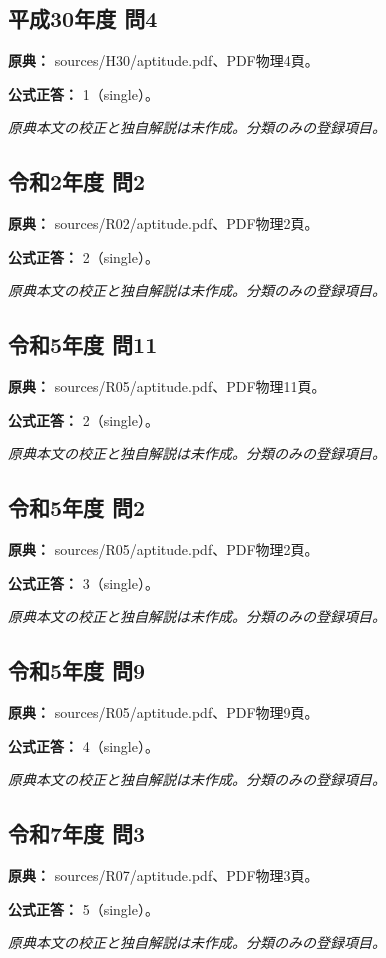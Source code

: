 \subsection{平成30年度 問4}
\label{q:h30-reg-apt-04}

\noindent\textbf{原典：} sources/H30/aptitude.pdf、PDF物理4頁。

\textbf{公式正答：} 1（single）。

\par\textit{原典本文の校正と独自解説は未作成。分類のみの登録項目。}

\subsection{令和2年度 問2}
\label{q:r02-reg-apt-02}

\noindent\textbf{原典：} sources/R02/aptitude.pdf、PDF物理2頁。

\textbf{公式正答：} 2（single）。

\par\textit{原典本文の校正と独自解説は未作成。分類のみの登録項目。}

\subsection{令和5年度 問11}
\label{q:r05-reg-apt-11}

\noindent\textbf{原典：} sources/R05/aptitude.pdf、PDF物理11頁。

\textbf{公式正答：} 2（single）。

\par\textit{原典本文の校正と独自解説は未作成。分類のみの登録項目。}

\subsection{令和5年度 問2}
\label{q:r05-reg-apt-02}

\noindent\textbf{原典：} sources/R05/aptitude.pdf、PDF物理2頁。

\textbf{公式正答：} 3（single）。

\par\textit{原典本文の校正と独自解説は未作成。分類のみの登録項目。}

\subsection{令和5年度 問9}
\label{q:r05-reg-apt-09}

\noindent\textbf{原典：} sources/R05/aptitude.pdf、PDF物理9頁。

\textbf{公式正答：} 4（single）。

\par\textit{原典本文の校正と独自解説は未作成。分類のみの登録項目。}

\subsection{令和7年度 問3}
\label{q:r07-reg-apt-03}

\noindent\textbf{原典：} sources/R07/aptitude.pdf、PDF物理3頁。

\textbf{公式正答：} 5（single）。

\par\textit{原典本文の校正と独自解説は未作成。分類のみの登録項目。}
